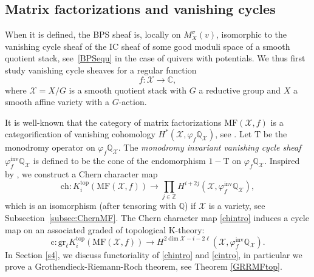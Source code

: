 \documentclass [11pt,oneside,a4paper,mathscr]{amsart}
\theoremstyle{definition}
\newcommand{\X}{\mathscr{X}}
\begin{document}
\subsection{Matrix factorizations and vanishing cycles}

When it is defined, the BPS sheaf
is, locally on $M_X^{\sigma}(v)$, isomorphic to the vanishing cycle sheaf 
of the IC sheaf of some good moduli space 
of a smooth quotient stack, see~\eqref{BPSequ} in the case of quivers with potentials.
We thus first study vanishing cycle sheaves
for a regular function 
\[f\colon \X\to \mathbb{C},\]
where $\X=X/G$ is a smooth quotient stack with 
$G$ a reductive group and $X$ a smooth affine variety
with a $G$-action.  

It is well-known that the category of matrix factorizations $\mathrm{MF}(\X, f)$ is a categorification of vanishing cohomology $H^{\ast}(\X, \varphi_f\mathbb{Q}_\X)$, see \cite{Eff, BRTV}. 
Let $\mathrm{T}$ be the monodromy operator on $\varphi_f\mathbb{Q}_{\X}$. 
The \textit{monodromy invariant vanishing cycle sheaf}
$\varphi^{\mathrm{inv}}_f\mathbb{Q}_{\X}$ is defined to 
be the cone of the endomorphism $1-\mathrm{T}$ on $\varphi_f\mathbb{Q}_\X$.
Inspired by \cite{Eff, BRTV, BD}, 
we construct a Chern character map
\begin{equation}\label{chintro}
    \mathrm{ch}\colon K^{\mathrm{top}}_i(\mathrm{MF}(\X,f))\to \prod_{j\in\mathbb{Z}}H^{i+2j}(\X, \varphi^{\mathrm{inv}}_f\mathbb{Q}_\X),
\end{equation}
which is an isomorphism (after tensoring with $\mathbb{Q}$) if $\X$ is a variety, see Subsection~\ref{subsec:ChernMF}. 
The Chern character map \eqref{chintro} induces a cycle map on an associated graded of topological K-theory:
\begin{equation}\label{cintro}
    \mathrm{c}\colon \mathrm{gr}_\ell K^{\mathrm{top}}_i(\mathrm{MF}(\X, f))\to H^{2\dim\X-i-2\ell}(\X, \varphi_{f}^{\mathrm{inv}}\mathbb{Q}_{\X}).
\end{equation}
In Section \ref{s4}, we discuss functoriality of \eqref{chintro} and \eqref{cintro}, in particular we prove a Grothendieck-Riemann-Roch theorem, see Theorem \ref{GRRMFtop}. 
\end{document}
